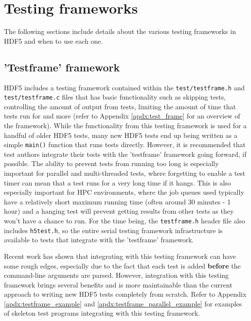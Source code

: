 \documentclass[../HDF5_RFC.tex]{subfiles}
\begin{document}
\section{Testing frameworks}
\label{frameworks}

The following sections include details about the various testing frameworks in HDF5 and when to use
each one.

\subsection{'Testframe' framework}

HDF5 includes a testing framework contained within the \texttt{test/testframe.h} and \texttt{test/testframe.c}
files that has basic functionality such as skipping tests, controlling the amount of output from tests,
limiting the amount of time that tests run for and more (refer to Appendix \ref{apdx:test_frame} for
an overview of the framework). While the functionality from this testing framework is used for a handful
of older HDF5 tests, many new HDF5 tests end up being written as a simple \texttt{main()} function
that runs tests directly. However, it is recommended that test authors integrate their tests with the
'testframe' framework going forward, if possible. The ability to prevent tests from running too long is
especially important for parallel and multi-threaded tests, where forgetting to enable a test timer can
mean that a test runs for a very long time if it hangs. This is also especially important for HPC
environments, where the job queues used typically have a relatively short maximum running time (often around
30 minutes - 1 hour) and a hanging test will prevent getting results from other tests as they won't have
a chance to run. For the time being, the \texttt{testframe.h} header file also includes \texttt{h5test.h}, so the entire serial testing framework infrastructure is available to tests that integrate with the 'testframe' framework.

Recent work has shown that integrating with this testing framework can have some rough edges, especially due
to the fact that each test is added \textbf{before} the command-line arguments are parsed. However,
integration with this testing framework brings several benefits and is more maintainable than the current approach to writing new HDF5 tests completely from scratch. Refer to Appendix \ref{apdx:testframe_example}
and \ref{apdx:testframe_parallel_example} for examples of skeleton test programs integrating with this
testing framework.
\end{document}
